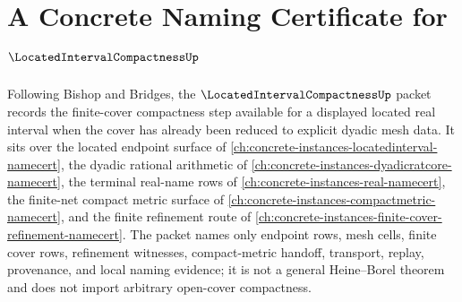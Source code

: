 \chapter{A Concrete Naming Certificate for $\LocatedIntervalCompactnessUp$}
\label{ch:concrete-instances-located-interval-compactness-namecert}

Following Bishop and Bridges, the $\LocatedIntervalCompactnessUp$ packet records the finite-cover compactness step available for a displayed located real interval when the cover has already been reduced to explicit dyadic mesh data. It sits over the located endpoint surface of \autoref{ch:concrete-instances-locatedinterval-namecert}, the dyadic rational arithmetic of \autoref{ch:concrete-instances-dyadicratcore-namecert}, the terminal real-name rows of \autoref{ch:concrete-instances-real-namecert}, the finite-net compact metric surface of \autoref{ch:concrete-instances-compactmetric-namecert}, and the finite refinement route of \autoref{ch:concrete-instances-finite-cover-refinement-namecert}. The packet names only endpoint rows, mesh cells, finite cover rows, refinement witnesses, compact-metric handoff, transport, replay, provenance, and local naming evidence; it is not a general Heine--Borel theorem and does not import arbitrary open-cover compactness.

